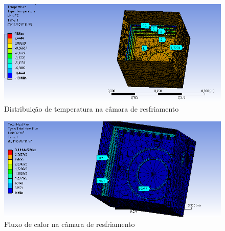 \begin{figure}[H]
\centering
\includegraphics[width=16cm]{figuras/tempcamara.PNG}
\caption{Distribuição de temperatura na câmara de resfriamento}
\end{figure}

\begin{figure}[H]
\centering
\includegraphics[width=16cm]{figuras/fluxocamara.PNG}
\caption{Fluxo de calor na câmara de resfriamento}
\end{figure}


